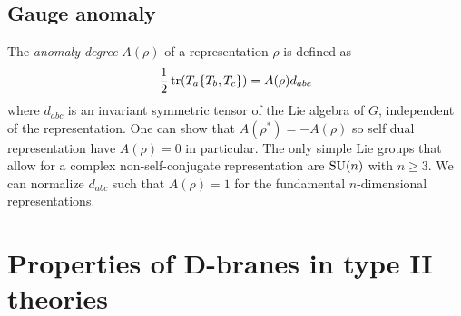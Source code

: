     \subsection{Gauge anomaly}\label{sec:anomalies}
        
        The \emph{anomaly degree} $A(\rho)$ of a representation $\rho$ is defined as
        \begin{equation}
            \frac{1}{2}\tr(T_a\{T_b,T_c\})=A(\rho)d_{abc}
        \end{equation}
        where $d_{abc}$ is an invariant symmetric tensor of the Lie algebra of $G$, independent of the representation. One can show that $A(\rho^*)=-A(\rho)$ so self dual representation have $A(\rho)=0$ in particular. The only simple Lie groups that allow for a complex non-self-conjugate representation are $\text{SU}(n)$ with $n\geq3$. We can normalize $d_{abc}$ such that $A(\rho)=1$ for the fundamental $n$-dimensional representations.
    
\section{Properties of D-branes in type II theories}

